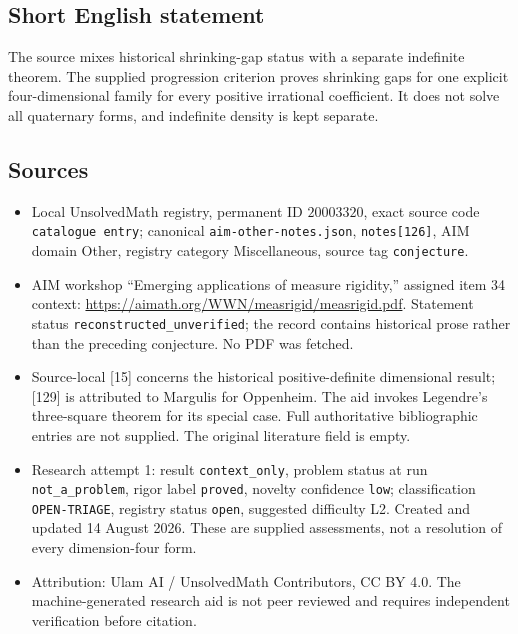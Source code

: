\documentclass[11pt]{article}
\begin{document}
\subsection{Short English statement}
The source mixes historical shrinking-gap status with a separate indefinite theorem. The supplied progression criterion proves shrinking gaps for one explicit four-dimensional family for every positive irrational coefficient. It does not solve all quaternary forms, and indefinite density is kept separate.
\subsection{Sources}
\begin{itemize}
\item Local UnsolvedMath registry, permanent ID \(20003320\), exact source code \texttt{catalogue entry}; canonical \texttt{aim-other-notes.json}, \texttt{notes[126]}, AIM domain Other, registry category Miscellaneous, source tag \texttt{conjecture}.
\item AIM workshop ``Emerging applications of measure rigidity,'' assigned item 34 context: \url{https://aimath.org/WWN/measrigid/measrigid.pdf}. Statement status \texttt{reconstructed\_unverified}; the record contains historical prose rather than the preceding conjecture. No PDF was fetched.
\item Source-local [15] concerns the historical positive-definite dimensional result; [129] is attributed to Margulis for Oppenheim. The aid invokes Legendre's three-square theorem for its special case. Full authoritative bibliographic entries are not supplied. The original literature field is empty.
\item Research attempt 1: result \texttt{context\_only}, problem status at run \texttt{not\_a\_problem}, rigor label \texttt{proved}, novelty confidence \texttt{low}; classification \texttt{OPEN-TRIAGE}, registry status \texttt{open}, suggested difficulty L2. Created and updated 14 August 2026. These are supplied assessments, not a resolution of every dimension-four form.
\item Attribution: Ulam AI / UnsolvedMath Contributors, CC BY 4.0. The machine-generated research aid is not peer reviewed and requires independent verification before citation.
\end{itemize}
\end{document}
